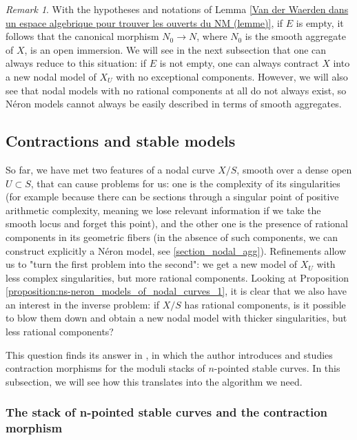 \documentclass[a4paper,12pt]{amsart} %
\numberwithin{equation}{subsection}
\theoremstyle{definition}
\theoremstyle{plain}%
\theoremstyle{remark}
\newtheorem{remark}[definition]{Remark}
\begin{document}
\begin{remark}
With the hypotheses and notations of Lemma \ref{Van der Waerden dans un espace algebrique pour trouver les ouverts du NM (lemme)}, if $E$ is empty, it follows that the canonical morphism $N_0\to N$, where $N_0$ is the smooth aggregate of $X$, is an open immersion. We will see in the next subsection that one can always reduce to this situation: if $E$ is not empty, one can always contract $X$ into a new nodal model of $X_U$ with no exceptional components. However, we will also see that nodal models with no rational components at all do not always exist, so N\'eron models cannot always be easily described in terms of smooth aggregates.
\end{remark}

\subsection{Contractions and stable models}

So far, we have met two features of a nodal curve $X/S$, smooth over a dense open $U\subset S$, that can cause problems for us: one is the complexity of its singularities (for example because there can be sections through a singular point of positive arithmetic complexity, meaning we lose relevant information if we take the smooth locus and forget this point), and the other one is the presence of rational components in its geometric fibers (in the absence of such components, we can construct explicitly a N\'eron model, see \ref{section_nodal_agg}). Refinements allow us to "turn the first problem into the second": we get a new model of $X_U$ with less complex singularities, but more rational components. Looking at Proposition \ref{proposition:ns-neron_models_of_nodal_curves_1}, it is clear that we also have an interest in the inverse problem: if $X/S$ has rational components, is it possible to blow them down and obtain a new nodal model with thicker singularities, but less rational components?

This question finds its answer in \cite{Knudsen}, in which the author introduces and studies contraction morphisms for the moduli stacks of $n$-pointed stable curves. In this subsection, we will see how this translates into the algorithm we need.

\subsubsection{The stack of n-pointed stable curves and the contraction morphism}
\end{document}
